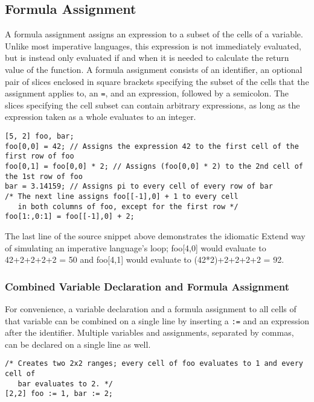 \subsection{Formula Assignment}
A formula assignment assigns an expression to a subset of the cells of a variable. Unlike most imperative languages, this expression is not immediately evaluated, but is instead only evaluated if and when it is needed to calculate the return value of the function. A formula assignment consists of an identifier, an optional pair of slices enclosed in square brackets specifying the subset of the cells that the assignment applies to, an \texttt{=}, and an expression, followed by a semicolon. The slices specifying the cell subset can contain arbitrary expressions, as long as the expression taken as a whole evaluates to an integer.
\begin{lstlisting}
[5, 2] foo, bar;
foo[0,0] = 42; // Assigns the expression 42 to the first cell of the first row of foo
foo[0,1] = foo[0,0] * 2; // Assigns (foo[0,0] * 2) to the 2nd cell of the 1st row of foo
bar = 3.14159; // Assigns pi to every cell of every row of bar
/* The next line assigns foo[[-1],0] + 1 to every cell
   in both columns of foo, except for the first row */
foo[1:,0:1] = foo[[-1],0] + 2; 
\end{lstlisting}
The last line of the source snippet above demonstrates the idiomatic Extend way of simulating an imperative language's loop; foo[4,0] would evaluate to 42+2+2+2+2 = 50 and foo[4,1] would evaluate to (42*2)+2+2+2+2 = 92.
\subsubsection{Combined Variable Declaration and Formula Assignment}
For convenience, a variable declaration and a formula assignment to all cells of that variable can be combined on a single line by inserting a \texttt{:=} and an expression after the identifier. Multiple variables and assignments, separated by commas, can be declared on a single line as well.
\begin{lstlisting}
/* Creates two 2x2 ranges; every cell of foo evaluates to 1 and every cell of
   bar evaluates to 2. */
[2,2] foo := 1, bar := 2; 
\end{lstlisting}
